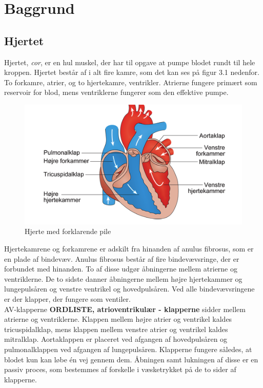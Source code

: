\chapter{Baggrund}

\section{Hjertet}
Hjertet, \textit{cor}, er en hul muskel, der har til opgave at pumpe blodet rundt til hele kroppen. Hjertet består af i alt fire kamre, som det kan ses på figur 3.1 nedenfor. To forkamre, atrier, og to hjertekamre, ventrikler. Atrierne fungere primært som reservoir for blod, mens ventriklerne fungerer som den effektive pumpe.\\

\begin{figure}[htb]
	\centering
	\includegraphics[width=1\textwidth]{Figurer/Snip20150410_31}
	\caption{Hjerte med forklarende pile \protect\footnotemark} 
\end{figure}

Hjertekamrene og forkamrene er adskilt fra hinanden af anulus fibrosus, som er en plade af bindevæv. Anulus fibrosus består af fire bindevævsringe, der er forbundet med hinanden. To af disse udgør åbningerne mellem atrierne og ventriklerne. De to sidste danner åbningerne mellem højre hjertekammer og lungepulsåren og venstre ventrikel og hovedpulsåren. Ved alle bindevævsringene er der klapper, der fungere som ventiler.\\ 
AV-klapperne \textbf{ORDLISTE, atrioventrikulær - klapperne} sidder mellem atrierne og ventriklerne. Klappen mellem højre atrier og ventrikel kaldes tricuspidalklap, mens klappen mellem venstre atrier og ventrikel kaldes mitralklap. Aortaklappen er placeret ved afgangen af hovedpulsåren og pulmonalklappen ved afgangen af lungepulsåren. Klapperne fungere således, at blodet kun kan løbe én vej gennem dem. Åbningen samt lukningen af disse er en passiv proces, som bestemmes af forskelle i væsketrykket på de to sider af klapperne.\\ 

